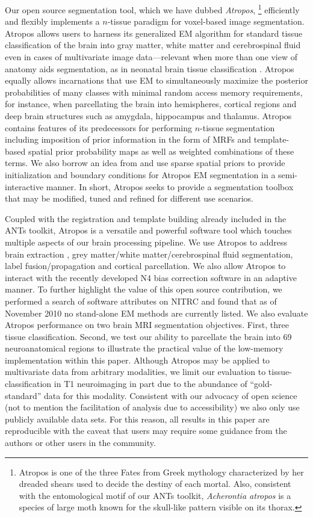 \documentclass[11pt,english]{article}
\begin{document}
Our open source segmentation tool, which we have dubbed {\em
Atropos},%
\footnote{Atropos is one of the three Fates from Greek
mythology characterized by her dreaded shears used to decide the
destiny of each mortal.  Also, consistent with the entomological motif
of our ANTs toolkit, {\it Acherontia atropos} is a species of large
moth known for the skull-like pattern visible on its thorax.  }
efficiently and flexibly implements a $n$-tissue paradigm for
voxel-based image segmentation.  Atropos allows users to harness its
generalized EM algorithm for standard tissue classification of
the brain into gray matter, white matter and cerebrospinal fluid even
in cases of multivariate image data---relevant when more than one 
view of anatomy aids segmentation, as in neonatal brain tissue classification
\citep[e.g.][]{Prastawa2005,Weisenfeld2009}.  
Atropos equally allows incarnations that use EM to simultaneously
maximize the posterior probabilities of many classes with minimal
random access memory requirements, for instance,
when parcellating the brain into hemispheres, cortical regions and
deep brain structures such as amygdala, hippocampus and
thalamus.  Atropos contains features of its predecessors for
performing $n$-tissue segmentation including imposition of prior
information in the form of MRFs and template-based spatial prior
probability maps as well as weighted combinations of these terms.  We
also borrow an idea from \cite{Boykov2004} and use sparse spatial
priors to provide initialization and boundary conditions for Atropos
EM segmentation in a semi-interactive manner.  In short, Atropos seeks
to provide a segmentation toolbox that may be modified,
tuned and refined for different use scenarios.

Coupled with the registration \citep{Avants2011} and template building
\citep{Avants2010} already included in the ANTs toolkit, Atropos is a
versatile and powerful software tool which touches multiple aspects of
our brain processing pipeline.  We use Atropos to address brain
extraction \citep{Avants2010a}, grey matter/white matter/cerebrospinal
fluid segmentation, label fusion/propagation and cortical
parcellation.  We also allow Atropos to interact with the recently
developed N4 bias correction software \citep{Tustison2010} in an
adaptive manner.  To further highlight the value of this open source
contribution, we performed a search of software attributes on NITRC
and found that as of November 2010 no stand-alone EM methods are
currently listed.  We also evaluate Atropos performance on two brain
MRI segmentation objectives.  First, three tissue classification.
Second, we test our ability to parcellate the brain into 69
neuroanatomical regions to illustrate the practical value of the
low-memory implementation within this paper.  Although Atropos may be
applied to multivariate data from arbitrary modalities, we limit our
evaluation to tissue-classification in T1 neuroimaging in part due to
the abundance of ``gold-standard'' data for this modality.  Consistent
with our advocacy of open science (not to mention the facilitation of
analysis due to accessibility) we also only use publicly available
data sets.  For this reason, all results in this paper are
reproducible with the caveat that users may require some guidance from
the authors or other users in the community.
\end{document}
